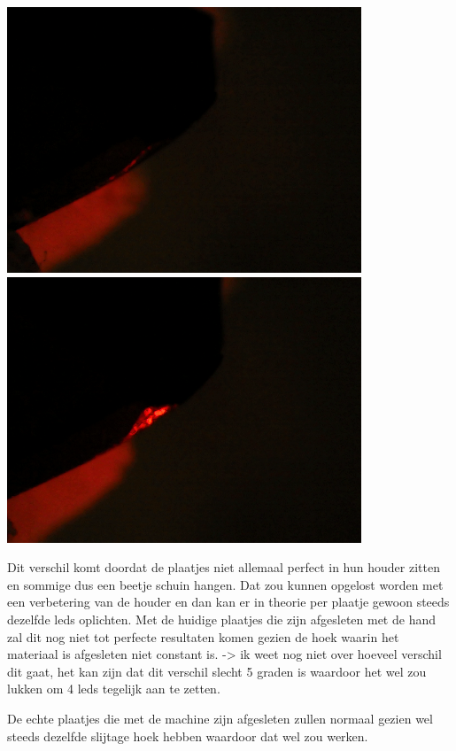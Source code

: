 \documentclass{article}
\begin{document}
\includegraphics[width=4.166667in, keepaspectratio=true]{./ZimFiles_files/Verslagen/Activiteiten_rapport/Activities/Masterproef_Tool_Wear_Inspection_-_Update_3_DH/p3_l9.png}\includegraphics[width=4.166667in, keepaspectratio=true]{./ZimFiles_files/Verslagen/Activiteiten_rapport/Activities/Masterproef_Tool_Wear_Inspection_-_Update_3_DH/p4_l9.png}

 

Dit verschil komt doordat de plaatjes niet allemaal perfect in hun houder zitten en sommige dus een beetje schuin hangen. Dat zou kunnen opgelost worden met een verbetering van de houder en dan kan er in theorie per plaatje gewoon steeds dezelfde leds oplichten. Met de huidige plaatjes die zijn afgesleten met de hand zal dit nog niet tot perfecte resultaten komen gezien de hoek waarin het materiaal is afgesleten niet constant is. -\textgreater{} ik weet nog niet over hoeveel verschil dit gaat, het kan zijn dat dit verschil slecht 5 graden is waardoor het wel zou lukken om 4 leds tegelijk aan te zetten.

De echte plaatjes die met de machine zijn afgesleten zullen normaal gezien wel steeds dezelfde slijtage hoek hebben waardoor dat wel zou werken.
\end{document}
